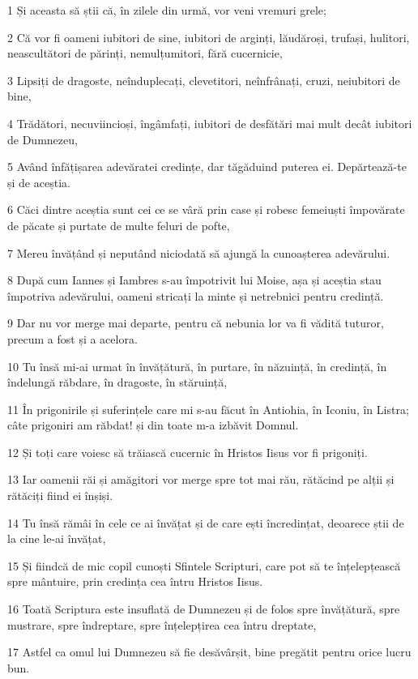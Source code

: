 \par 1 Și aceasta să știi că, în zilele din urmă, vor veni vremuri grele;
\par 2 Că vor fi oameni iubitori de sine, iubitori de arginți, lăudăroși, trufași, hulitori, neascultători de părinți, nemulțumitori, fără cucernicie,
\par 3 Lipsiți de dragoste, neînduplecați, clevetitori, neînfrânați, cruzi, neiubitori de bine,
\par 4 Trădători, necuviincioși, îngâmfați, iubitori de desfătări mai mult decât iubitori de Dumnezeu,
\par 5 Având înfățișarea adevăratei credințe, dar tăgăduind puterea ei. Depărtează-te și de aceștia.
\par 6 Căci dintre aceștia sunt cei ce se vâră prin case și robesc femeiuști împovărate de păcate și purtate de multe feluri de pofte,
\par 7 Mereu învățând și neputând niciodată să ajungă la cunoașterea adevărului.
\par 8 După cum Iannes și Iambres s-au împotrivit lui Moise, așa și aceștia stau împotriva adevărului, oameni stricați la minte și netrebnici pentru credință.
\par 9 Dar nu vor merge mai departe, pentru că nebunia lor va fi vădită tuturor, precum a fost și a acelora.
\par 10 Tu însă mi-ai urmat în învățătură, în purtare, în năzuință, în credință, în îndelungă răbdare, în dragoste, în stăruință,
\par 11 În prigonirile și suferințele care mi s-au făcut în Antiohia, în Iconiu, în Listra; câte prigoniri am răbdat! și din toate m-a izbăvit Domnul.
\par 12 Și toți care voiesc să trăiască cucernic în Hristos Iisus vor fi prigoniți.
\par 13 Iar oamenii răi și amăgitori vor merge spre tot mai rău, rătăcind pe alții și rătăciți fiind ei înșiși.
\par 14 Tu însă rămâi în cele ce ai învățat și de care ești încredințat, deoarece știi de la cine le-ai învățat,
\par 15 Și fiindcă de mic copil cunoști Sfintele Scripturi, care pot să te înțelepțească spre mântuire, prin credința cea întru Hristos Iisus.
\par 16 Toată Scriptura este insuflată de Dumnezeu și de folos spre învățătură, spre mustrare, spre îndreptare, spre înțelepțirea cea întru dreptate,
\par 17 Astfel ca omul lui Dumnezeu să fie desăvârșit, bine pregătit pentru orice lucru bun.


